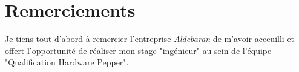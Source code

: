 
\chapter*{Remerciements}
Je tiens tout d'abord à remercier l'entreprise \emph{Aldebaran} de m'avoir acceuilli et offert l'opportunité de réaliser mon stage "ingénieur" au sein de l'équipe "Qualification Hardware Pepper".


